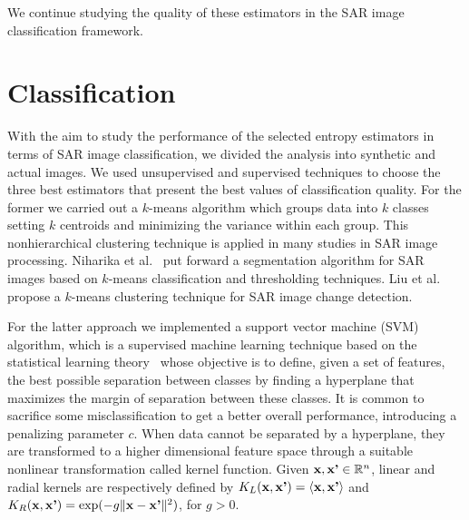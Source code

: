 \documentclass[journal]{IEEEtran}
\begin{document}
We continue studying the quality of these estimators in the SAR image classification framework.
	

\section{Classification}
\label{Classification}

With the aim to study the performance of the selected entropy estimators in terms of  SAR image classification, we divided the analysis into synthetic and actual images. 
We used unsupervised and supervised techniques to choose the three best estimators that present the best values of classification quality. 
For the former we carried out a $k$-means algorithm which groups data into $k$ classes setting $k$ centroids and minimizing the  variance  within  each group. 
This nonhierarchical clustering technique is applied in many studies in SAR image processing. 
Niharika et al.~\cite{Niharika2017} put forward a segmentation algorithm for SAR images based on $k$-means classification and thresholding  techniques. 
Liu et al.~\cite{Liu2019} propose a $k$-means clustering technique for SAR image change detection.

For the latter approach we implemented a support vector machine (SVM) algorithm, which is a supervised machine learning technique based on the statistical learning theory~\cite{Vapnik1995} whose objective is to define, given a set of features,  the best possible separation between classes by finding a hyperplane that maximizes the margin of separation between these classes. It is common to sacrifice some misclassification to get a better overall performance, introducing a penalizing parameter $c$. When data cannot be separated by a hyperplane, they are transformed to a higher dimensional feature space through a suitable nonlinear transformation called kernel function. Given $\textrm{\textbf{x}}, \textrm{\textbf{x'}} \in \mathbb{R}^n$, linear and radial kernels are respectively defined by $K_L(\textrm{\textbf{x}}, \textrm{\textbf{x'}})=\langle \textrm{\textbf{x}}, \textrm{\textbf{x'}} \rangle$ and $K_R(\textrm{\textbf{x}}, \textrm{\textbf{x'}})=\exp(-g\lVert \textrm{\textbf{x}}-\textrm{\textbf{x'}} \rVert^2)$, for $g>0$.
\end{document}
